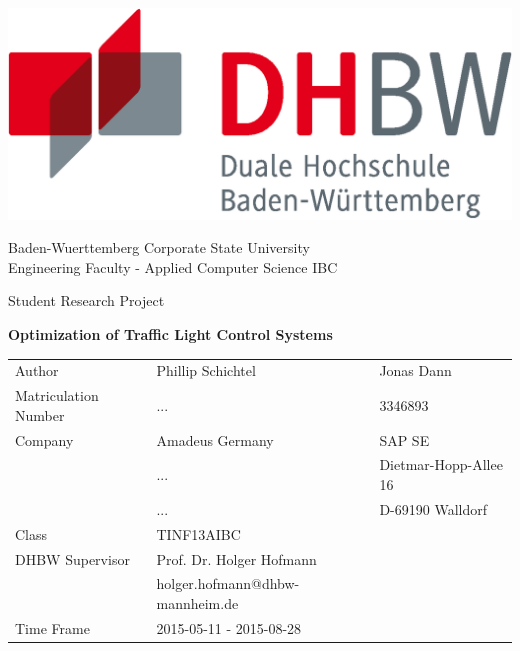 \thispagestyle{empty}

\includegraphics[scale=0.3]{resources/dhbw_logo.eps} \\

\begin{center}

\vspace{0.5cm}

{\large Baden-Wuerttemberg Corporate State University}\\
{\large Engineering Faculty - Applied Computer Science IBC}\\

\vspace{0.5cm}

{\large Student Research Project}\\

\vspace{1cm}

{\large \textbf{Optimization of Traffic Light Control Systems}}

\vspace{1.5cm}

\begin{tabular}{lll}
Author				& Phillip Schichtel & Jonas Dann \\
Matriculation Number& ... & 3346893 \\
Company				& Amadeus Germany & SAP SE \\
					& ... & Dietmar-Hopp-Allee 16 \\
					& ... & D-69190 Walldorf \\
Class				& TINF13AIBC & \\
DHBW Supervisor	    & Prof. Dr. Holger Hofmann & \\
					& holger.hofmann@dhbw-mannheim.de & \\
Time Frame			& 2015-05-11 - 2015-08-28\\
\end{tabular}

\vspace{0.5cm}
\vspace{0.5cm}

\end{center}

\newpage